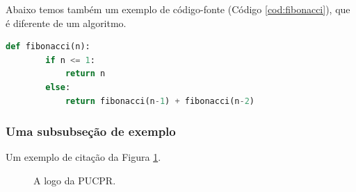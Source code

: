 \lipsum[2-4]

Abaixo temos também um exemplo de código-fonte (Código \ref{cod:fibonacci}), que é diferente de um algoritmo.
\begin{lstlisting}[language=Python, caption=A função de Fibonacci escrita em Python., label=cod:fibonacci]
	def fibonacci(n):
		if n <= 1:
			return n
		else:
			return fibonacci(n-1) + fibonacci(n-2)
\end{lstlisting}
	
	
\lipsum[2-4]		

\subsubsection{Uma subsubseção de exemplo}

Um exemplo de citação da Figura \ref{fig:logopucpr}.

\begin{figure}[!t]
	\centering
	\caption{A logo da PUCPR.}
	\label{fig:logopucpr}
\end{figure}	

